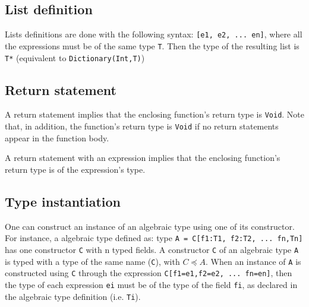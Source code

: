 \documentclass[11pt]{report}
\begin{document}
\subsection{List definition}

Lists definitions are done with the following syntax: \texttt{[e1, e2, ... en]}, where all the expressions must be of the same type \texttt{T}. Then the type of the resulting list is \texttt{T*} (equivalent to \texttt{Dictionary(Int,T)})

\begin{center}
\DP
\end{center}

\subsection{Return statement}

A return statement implies that the enclosing function's return type is \texttt{Void}. Note that, in addition, the function's return type is \texttt{Void} if no return statements appear in the function body.

\begin{center}
\DP
\end{center}

A return statement with an expression implies that the enclosing function's return type is of the expression's type.

\begin{center}
  
\DP
\end{center}

\subsection{Type instantiation}

One can construct an instance of an algebraic type using one of its constructor. For instance, a algebraic type defined as: type \texttt{A = C[f1:T1, f2:T2, ... fn,Tn]} has one constructor \texttt{C} with n typed fields. A constructor \texttt{C} of an algebraic type \texttt{A} is typed with a type of the same name (\texttt{C}), with $C \preceq A$. When an instance of \texttt{A} is constructed using \texttt{C} through the expression \texttt{C[f1=e1,f2=e2, ... fn=en]}, then the type of each expression \texttt{ei} must be of the type of the field \texttt{fi}, as declared in the algebraic type definition (i.e. \texttt{Ti}).
\end{document}
